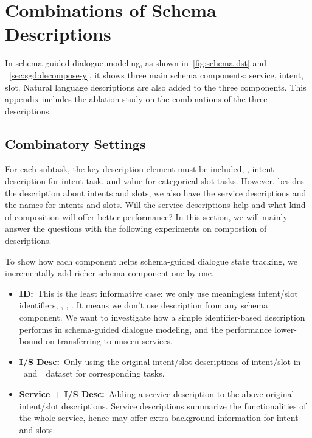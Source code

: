 \chapter[Combinations of Schema Descriptions]{Combinations of
  Schema \\Descriptions}
\label{chap:appendix:schema}
In schema-guided dialogue modeling, as shown
in~\autoref{fig:schema-dst} and ~\autoref{sec:sgd:decompose-y}, it
shows three main schema components: service, intent, slot. Natural
language descriptions are also added to the three components. This
appendix includes the ablation study on the combinations of the three
descriptions.

\section{Combinatory Settings}
\label{sec:sgd:com-desc}
For each subtask, the key description element must be included, \eg,
intent description for intent task, and value for categorical slot
tasks. However, besides the description about intents and slots, we
also have the service descriptions and the names for intents and
slots. Will the service descriptions help and what kind of composition
will offer better performance? In this section, we will mainly answer
the questions with the following experiments on compostion of
descriptions.

To show how each component helps schema-guided dialogue state tracking,
we incrementally add richer schema component one by one.

\begin{itemize}
\item \textbf{ID:}~This is the least informative case: we only use
  meaningless intent/slot identifiers, \eg, , . It means we don't use
  description from any schema component. We want to investigate how a
  simple identifier-based description performs in schema-guided dialogue
  modeling, and the performance lower-bound on transferring to unseen services.

\item \textbf{I/S Desc:}~Only using the original intent/slot descriptions
  of intent/slot in \sgdst~and~\multiwoz~dataset for corresponding
  tasks.

\item \textbf{Service + I/S Desc:}~Adding a service description to the above
  original intent/slot descriptions. Service descriptions summarize the
  functionalities of the whole service, hence may offer extra background
  information for intent and slots.
\end{itemize}

